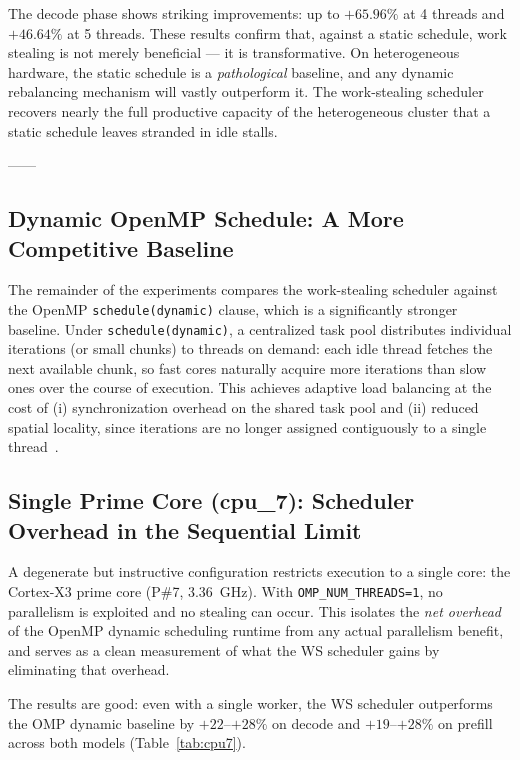 \documentclass[11pt,english]{article}
\begin{document}
The decode phase shows striking improvements: up to $+65.96\%$ at 4 threads and $+46.64\%$ at 5 threads. These results confirm that, against a static schedule, work stealing is not merely beneficial — it is transformative. On heterogeneous hardware, the static schedule is a \emph{pathological} baseline, and any dynamic rebalancing mechanism will vastly outperform it. The work-stealing scheduler recovers nearly the full productive capacity of the heterogeneous cluster that a static schedule leaves stranded in idle stalls.
 
------
\subsection{Dynamic OpenMP Schedule: A More Competitive Baseline}
 
The remainder of the experiments compares the work-stealing scheduler against the OpenMP \texttt{schedule(dynamic)} clause, which is a significantly stronger baseline. Under \texttt{schedule(dynamic)}, a centralized task pool distributes individual iterations (or small chunks) to threads on demand: each idle thread fetches the next available chunk, so fast cores naturally acquire more iterations than slow ones over the course of execution. This achieves adaptive load balancing at the cost of (i) synchronization overhead on the shared task pool and (ii) reduced spatial locality, since iterations are no longer assigned contiguously to a single thread~\cite{yanghe2018survey}.

\subsection{Single Prime Core (cpu\_7): Scheduler Overhead in the Sequential Limit}
 
A degenerate but instructive configuration restricts execution to a single core: the Cortex-X3 prime core (P\#7, 3.36~GHz). With \texttt{OMP\_NUM\_THREADS=1}, no parallelism is exploited and no stealing can occur. This isolates the \emph{net overhead} of the OpenMP dynamic scheduling runtime from any actual parallelism benefit, and serves as a clean measurement of what the WS scheduler gains by eliminating that overhead.
 
The results are good: even with a single worker, the WS scheduler outperforms the OMP dynamic baseline by $+22$--$+28\%$ on decode and $+19$--$+28\%$ on prefill across both models (Table~\ref{tab:cpu7}).
 
\end{document}
